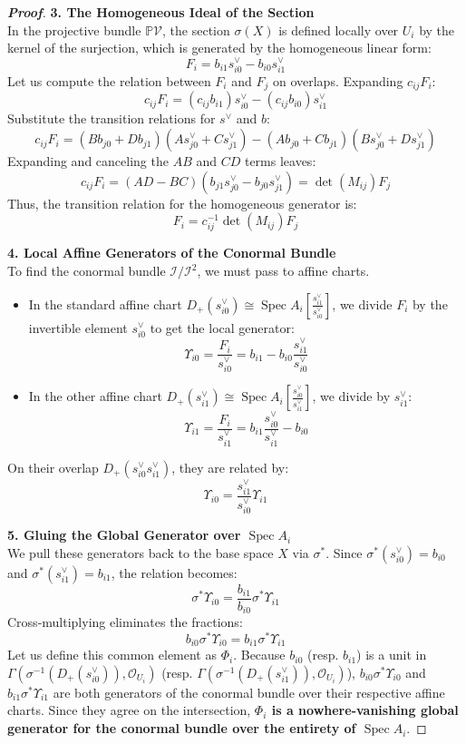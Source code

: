 \begin{proof}[\textbf{Proof}]
\textbf{3. The Homogeneous Ideal of the Section} \\
In the projective bundle $\mathbb{P}\mathcal{V}$, the section $\sigma(X)$ is defined locally over $U_i$ by the kernel of the surjection, which is generated by the homogeneous linear form:
\[
F_i = b_{i1}s_{i0}^\vee - b_{i0}s_{i1}^\vee
\]
Let us compute the relation between $F_i$ and $F_j$ on overlaps. Expanding $c_{ij}F_i$:
\[
c_{ij} F_i = (c_{ij} b_{i1})s_{i0}^\vee - (c_{ij} b_{i0})s_{i1}^\vee
\]
Substitute the transition relations for $s^\vee$ and $b$:
\[
c_{ij} F_i = (B b_{j0} + D b_{j1})(A s_{j0}^\vee + C s_{j1}^\vee) - (A b_{j0} + C b_{j1})(B s_{j0}^\vee + D s_{j1}^\vee)
\]
Expanding and canceling the $AB$ and $CD$ terms leaves:
\[
c_{ij} F_i = (AD - BC)(b_{j1}s_{j0}^\vee - b_{j0}s_{j1}^\vee) = \det(M_{ij}) F_j
\]
Thus, the transition relation for the homogeneous generator is:
\[
F_i = c_{ij}^{-1} \det(M_{ij}) F_j
\]

\textbf{4. Local Affine Generators of the Conormal Bundle} \\
To find the conormal bundle $\mathcal{I}/\mathcal{I}^2$, we must pass to affine charts. 
\begin{itemize}
    \item In the standard affine chart $D_+(s_{i0}^\vee) \cong \operatorname{Spec} A_i\left[\frac{s_{i1}^\vee}{s_{i0}^\vee}\right]$, we divide $F_i$ by the invertible element $s_{i0}^\vee$ to get the local generator:
    \[
    \Upsilon_{i0} = \frac{F_i}{s_{i0}^\vee} = b_{i1} - b_{i0}\frac{s_{i1}^\vee}{s_{i0}^\vee}
    \]
    \item In the other affine chart $D_+(s_{i1}^\vee) \cong \operatorname{Spec} A_i\left[\frac{s_{i0}^\vee}{s_{i1}^\vee}\right]$, we divide by $s_{i1}^\vee$:
    \[
    \Upsilon_{i1} = \frac{F_i}{s_{i1}^\vee} = b_{i1}\frac{s_{i0}^\vee}{s_{i1}^\vee} - b_{i0}
    \]
\end{itemize}
On their overlap $D_+(s_{i0}^\vee s_{i1}^\vee)$, they are related by:
\[
\Upsilon_{i0} = \frac{s_{i1}^\vee}{s_{i0}^\vee} \Upsilon_{i1}
\]

\textbf{5. Gluing the Global Generator over $\operatorname{Spec} A_i$} \\
We pull these generators back to the base space $X$ via $\sigma^*$. Since $\sigma^*(s_{i0}^\vee) = b_{i0}$ and $\sigma^*(s_{i1}^\vee) = b_{i1}$, the relation becomes:
\[
\sigma^*\Upsilon_{i0} = \frac{b_{i1}}{b_{i0}} \sigma^*\Upsilon_{i1}
\]
Cross-multiplying eliminates the fractions:
\[
b_{i0} \sigma^*\Upsilon_{i0} = b_{i1} \sigma^*\Upsilon_{i1}
\]
Let us define this common element as \textbf{$\Phi_i$}. 
Because $b_{i0}$ (resp. $b_{i1}$) is a unit in $\Gamma(\sigma^{-1}(D_+(s_{i0}^\vee)), \mathcal{O}_{U_i})$ (resp. $\Gamma(\sigma^{-1}(D_+(s_{i1}^\vee)), \mathcal{O}_{U_i})$), 
$b_{i0} \sigma^*\Upsilon_{i0}$ and $b_{i1} \sigma^*\Upsilon_{i1}$ are both generators of the conormal bundle over their respective affine charts.
Since they agree on the intersection, \textbf{$\Phi_i$ is a nowhere-vanishing global generator for the conormal bundle over the entirety of $\operatorname{Spec} A_i$}.


\end{proof}
